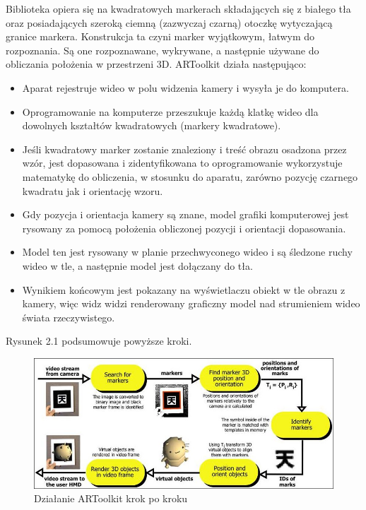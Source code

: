 Biblioteka opiera się na kwadratowych markerach składających się z białego tła oraz posiadających szeroką ciemną (zazwyczaj czarną) otoczkę wytyczającą granice markera. Konstrukcja ta czyni marker wyjątkowym, łatwym do rozpoznania. Są one rozpoznawane, wykrywane, a następnie używane do obliczania położenia w przestrzeni 3D. ARToolkit działa następująco:
\begin{itemize}
	\item Aparat rejestruje wideo w polu widzenia kamery i wysyła je do komputera.
	\item Oprogramowanie na komputerze przeszukuje każdą klatkę wideo dla dowolnych kształtów kwadratowych (markery kwadratowe).
	\item Jeśli kwadratowy marker zostanie znaleziony i treść obrazu osadzona przez wzór, jest dopasowana i zidentyfikowana to oprogramowanie wykorzystuje matematykę do obliczenia, w stosunku do aparatu, zarówno pozycję czarnego kwadratu jak i orientację wzoru.
	\item Gdy pozycja i orientacja kamery są znane, model grafiki komputerowej jest rysowany za pomocą położenia obliczonej pozycji i orientacji dopasowania.
	\item Model ten jest rysowany w planie przechwyconego wideo i są śledzone ruchy wideo w tle, a następnie model jest dołączany do tła.
	\item Wynikiem końcowym jest pokazany na wyświetlaczu obiekt w tle obrazu z kamery, więc widz widzi renderowany graficzny model nad strumieniem wideo świata rzeczywistego.
\end{itemize}
Rysunek 2.1 podsumowuje powyższe kroki.
\bigskip

\begin{figure}[ht!]
\centering
\includegraphics[width=150mm]{diagram.jpg}
\caption{Działanie ARToolkit krok po kroku \label{artoolkitsteps}}
\end{figure}

